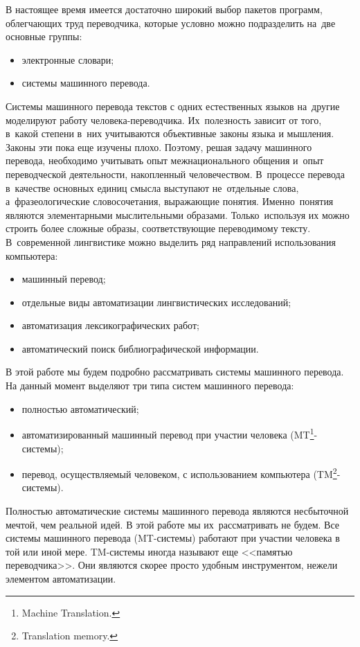 	
	В настоящее время имеется достаточно широкий выбор пакетов программ, 
	облегчающих труд переводчика, которые условно можно подразделить на~две основные группы:
	\begin{itemize}
		\item  электронные словари;
		\item  системы машинного перевода.
	\end{itemize}
	
	Системы машинного перевода текстов с одних естественных языков 
	на~другие моделируют работу человека-переводчика. 
	Их~полезность зависит от того, в~какой степени 
	в~них учитываются объективные законы языка и мышления. 
	Законы эти пока еще изучены плохо. 
	Поэтому, решая задачу машинного перевода, 
	необходимо учитывать опыт межнационального общения 
	и~опыт переводческой деятельности, накопленный человечеством. 
	В~процессе перевода в~качестве основных единиц смысла выступают 
	не~отдельные слова, а~фразеологические словосочетания, выражающие понятия. 
	Именно~понятия являются элементарными мыслительными образами. 
	Только~используя их можно строить более сложные образы, 
	соответствующие переводимому тексту. 
	В~современной лингвистике можно выделить 
	ряд направлений использования компьютера:
	\begin{itemize}
		\item машинный перевод;
		\item отдельные виды автоматизации лингвистических исследований;
		\item автоматизация лексикографических работ;
		\item автоматический поиск библиографической информации.
	\end{itemize}
	
	В этой работе мы будем подробно рассматривать системы машинного перевода.
	На данный момент выделяют три типа систем машинного перевода:
	\begin{itemize}
		\item полностью автоматический;
		\item автоматизированный машинный перевод 
			при участии человека (MT\footnote{Machine Translation.}-системы);
		\item перевод, осуществляемый человеком, 
			с использованием компьютера (TM\footnote{Translation memory.}-системы).
	\end{itemize}
	
	Полностью автоматические системы машинного перевода являются 
	несбыточной мечтой, чем реальной идей. 
	В этой работе мы их~рассматривать не будем. 
	Все системы машинного перевода (MT-системы) работают при участии человека 
	в той или иной мере. 
	TM-системы иногда называют еще <<памятью переводчика>>. 
	Они  являются скорее просто удобным инструментом, 
	нежели элементом автоматизации.

